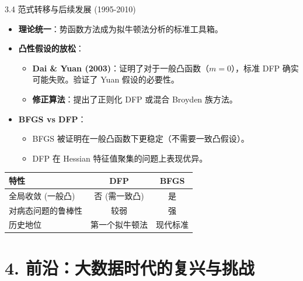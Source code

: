 \documentclass[11pt,hyperref={pdfpagelabels=false}]{beamer}
\begin{document}
\begin{frame}{3.4 范式转移与后续发展 (1995-2010)}
    \begin{itemize}
        \item \textbf{理论统一}：势函数方法成为拟牛顿法分析的标准工具箱。
        \item \textbf{凸性假设的放松}：
        \begin{itemize}
            \item \textbf{Dai \& Yuan (2003)}：证明了对于一般凸函数（$m=0$），标准 DFP 确实可能失败。验证了 Yuan 假设的必要性。
            \item \textbf{修正算法}：提出了正则化 DFP 或混合 Broyden 族方法。
        \end{itemize}
        \item \textbf{BFGS vs DFP}：
        \begin{itemize}
            \item BFGS 被证明在一般凸函数下更稳定（不需要一致凸假设）。
            \item DFP 在 Hessian 特征值聚集的问题上表现优异。
        \end{itemize}
    \end{itemize}
    \begin{table}[]
        \begin{tabular}{lcc}
        \toprule
        \textbf{特性} & \textbf{DFP} & \textbf{BFGS} \\
        \midrule
        全局收敛 (一般凸) & 否 (需一致凸) & 是 \\
        对病态问题的鲁棒性 & 较弱 & 强 \\
        历史地位 & 第一个拟牛顿法 & 现代标准 \\
        \bottomrule
        \end{tabular}
    \end{table}
\end{frame}

\section{4. 前沿：大数据时代的复兴与挑战}
\end{document}
